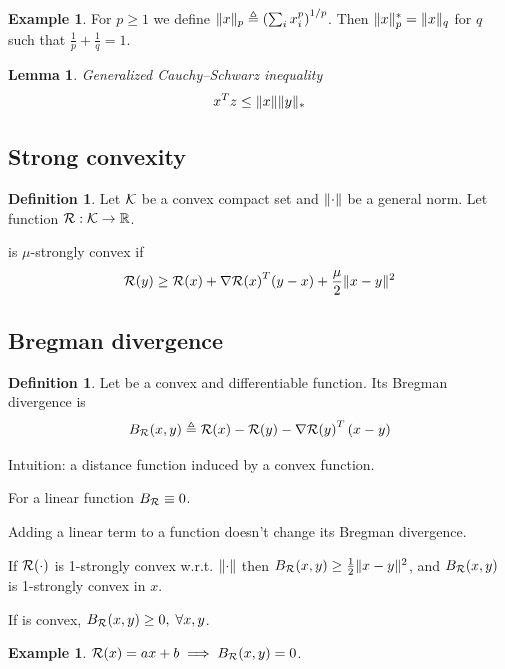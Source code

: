 \documentclass[11pt]{article}
\newtheorem{lemma}[theorem]{Lemma}
\theoremstyle{definition}
\newtheorem{definition}[theorem]{Definition}
\theoremstyle{definition}
\newtheorem{example}[theorem]{Example}
\newcommand{\pth}[1]{\left( #1\right)}                 %
\newcommand{\wrt}{w.r.t.}
\newcommand{\strongcvx}[1]{#1-strongly convex}
\newcommand{\Kset}{\ensuremath{\K}}
\begin{document}
\begin{example}
For $p \geq 1$ we define $ \norm{x}_p \triangleq \pth{\sum_i x_i^p}^{1/p} $. Then $\mathopen\| x \mathclose\|_p^* = \mathopen\| x \mathclose\|_q$ for $q$ such that $ \frac{1}{p} + \frac{1}{q} = 1 $.
\end{example}

\begin{lemma}
Generalized Cauchy–Schwarz inequality
\begin{equation*}
x^T z \leq \mathopen\| x \mathclose\| \mathopen\| y \mathclose\|_*
\end{equation*}
\end{lemma}

\subsection{Strong convexity}
\begin{definition}
Let \Kset{} be a convex compact set and $\mathopen\| \cdot \mathclose\|$ be a general norm. Let function $\R : \Kset \to \reals$.

\R{} is $\mu$-strongly convex if
\begin{equation*}
\mathcal R(y) \geq \mathcal R(x) + {\nabla\mathcal R(x)}^T (y-x) + \frac{\mu}{2} \mathopen\| x - y \mathclose\|^2
\end{equation*}

\end{definition}


\subsection{Bregman divergence}
\begin{definition}
Let \R{} be a convex and differentiable function. Its Bregman divergence is
\begin{equation*}
B_\R (x,y) \triangleq \R(x) - \R(y) - {\nabla \R(y)}^T \pth{x - y}
\end{equation*}
\end{definition}

Intuition: a distance function induced by a convex function.

For a linear function $ B_{\mathcal R} \equiv 0 $.

Adding a linear term to a function doesn't change its Bregman divergence.

If $ \mathcal R(\cdot) $ is \strongcvx{1} \wrt{} $ \mathopen\| \cdot \mathclose\| $ then $ B_{\mathcal R}(x,y) \geq \frac{1}{2} \mathopen\| x-y \mathclose\|^2 $, and $B_{\mathcal R}(x,y)$ is \strongcvx{1} in $x$.

If \R{} is convex, $ B_{\mathcal R}(x,y) \geq 0, \; \forall x,y$.

\begin{example}
$ \mathcal R(x) = a x + b
\implies
B_{\mathcal R}(x,y) = 0 $.
\end{example}
\end{document}
